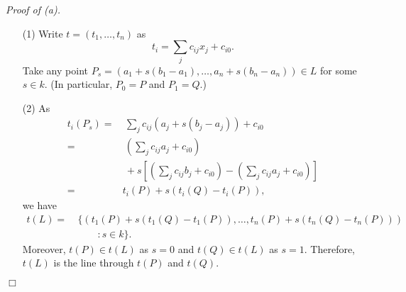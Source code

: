 \documentclass{article}
\begin{document}
\emph{Proof of (a).}
\begin{enumerate}
\item[(1)]
  Write $t = (t_1,\ldots,t_n)$ as
  \[
    t_i = \sum_{j} c_{ij} x_j + c_{i0}.
  \]
  Take any point $P_{s} = ( a_1 + s(b_1-a_1), \ldots, a_n + s(b_n-a_n) ) \in L$
  for some $s \in k$.
  (In particular, $P_0 = P$ and $P_1 = Q$.)

\item[(2)]
  As
  \begin{align*}
    t_i(P_{s})
    =& \: \sum_{j} c_{ij}(a_j + s(b_j-a_j)) + c_{i0} \\
    =& \: \left( \sum_{j} c_{ij} a_j + c_{i0} \right) \\
      & \: + s \left[ \left( \sum_{j} c_{ij} b_j + c_{i0} \right)
        - \left( \sum_{j} c_{ij} a_j + c_{i0} \right) \right] \\
    =& t_i(P) + s(t_i(Q) - t_i(P)),
  \end{align*}
  we have
  \begin{align*}
    t(L) =& \: \{ (t_1(P) + s(t_1(Q) - t_1(P)), \ldots, t_n(P) + s(t_n(Q) - t_n(P))) \\
      & \: \qquad : s \in k\}.
  \end{align*}
  Moreover, $t(P) \in t(L)$ as $s = 0$ and $t(Q) \in t(L)$ as $s = 1$.
  Therefore, $t(L)$ is the line through $t(P)$ and $t(Q)$.
\end{enumerate}
$\Box$ \\
\end{document}
